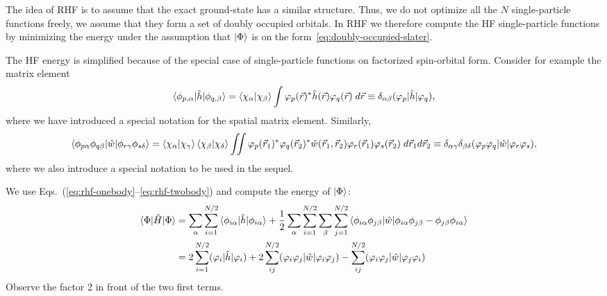 \documentclass{report}
\theoremstyle{plain}
\theoremstyle{definition}
\begin{document}
The idea of RHF is to assume that the exact ground-state has a similar
structure. Thus, we do not optimize all the $N$ single-particle
functions freely, we assume that they form a set of doubly occupied
orbitals. In RHF we therefore compute the HF single-particle functions
by minimizing the energy under the assumption that $\ket{\Phi}$ is on
the form~\eqref{eq:doubly-occupied-slater}.

The HF energy is simplified because of the special case of
single-particle functions on factorized spin-orbital form. Consider
for example the matrix element
\begin{equation}
  \braket{\phi_{p,\alpha}|\hat{h}|\phi_{q,\beta}} =
  \braket{\chi_\alpha|\chi_\beta}\int
  \varphi_p(\vec{r})^*\hat{h}(\vec{r})\varphi_q(\vec{r}) \; d\vec{r}
  \equiv \delta_{\alpha\beta} (\varphi_p|\hat{h}|\varphi_q), \label{eq:rhf-onebody}
\end{equation}
where we have introduced a special notation for the spatial matrix
element. Similarly,
\begin{equation}
  \braket{\phi_{p\alpha}\phi_{q\beta}|\hat{w}|\phi_{r\gamma}\phi_{s\delta}}
  = \braket{\chi_\alpha|\chi_\gamma}\braket{\chi_\beta|\chi_\delta}\iint
  \varphi_p(\vec{r}_1)^*\varphi_q(\vec{r}_2)^*
  \hat{w}(\vec{r}_1,\vec{r}_2)
  \varphi_r(\vec{r}_1)\varphi_s(\vec{r}_2) \; d \vec{r}_1 d\vec{r}_2
  \equiv \delta_{\alpha\gamma}\delta_{\beta\delta}
  (\varphi_p\varphi_q|\hat{w}|\varphi_r\varphi_s),  \label{eq:rhf-twobody}
\end{equation}
where we also introduce a special notation to be used in the sequel.

We use Eqs.~(\ref{eq:rhf-onebody}--\ref{eq:rhf-twobody}) and compute
the energy of $\ket{\Phi}$: 
\begin{equation}
  \begin{split}
    \braket{\Phi|\hat{H}|\Phi} &= \sum_\alpha \sum_{i=1}^{N/2}
    \braket{\phi_{i\alpha}|\hat{h}|\phi_{i\alpha}} +
    \frac{1}{2}\sum_\alpha\sum_{i=1}^{N/2}\sum_\beta \sum_{j=1}^{N/2}
    \braket{\phi_{i\alpha}\phi_{j\beta}|\hat{w}|\phi_{i\alpha}\phi_{j\beta}
      - \phi_{j\beta} \phi_{i\alpha}} \\
    & = 2\sum_{i=1}^{N/2} (\varphi_i|\hat{h}|\varphi_i) +
    2\sum_{ij}^{N/2}
    (\varphi_i\varphi_j|\hat{w}|\varphi_i\varphi_j) -
    \sum_{ij}^{N/2}
    (\varphi_i\varphi_j|\hat{w}|\varphi_j\varphi_i)  \label{eq:rhf-energy}
  \end{split}
\end{equation}
Observe the factor 2 in front of the two first terms.
\end{document}

